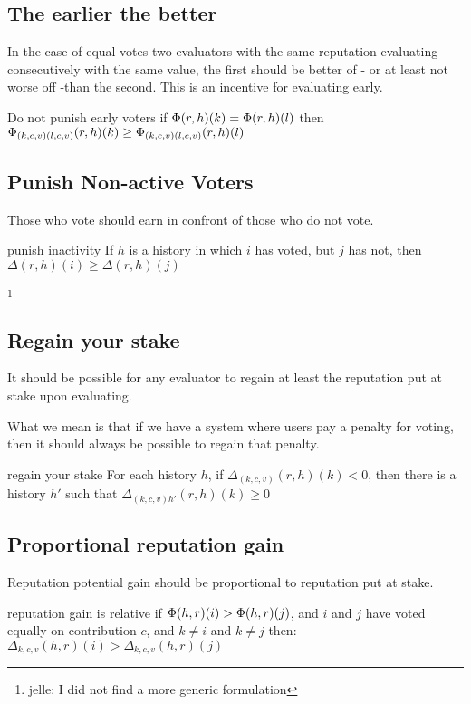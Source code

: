 \documentclass{article}
\begin{document}
\subsection{The earlier the better}


In the case of equal votes two evaluators with the same reputation evaluating consecutively with the same value, the first should be better of - or at least not worse off -than the second. This is an incentive for evaluating early.
\begin{condition}{Do not punish early voters}
if $\Phi(r, h)(k) = \Phi(r, h)(l)$ then $\Phi_{(k, c, v)(l,c,v)}(r, h)(k) \geq  \Phi_{(k, c, v)(l, c, v)}(r, h)(l)$
\end{condition}

\subsection{Punish Non-active Voters}

Those who vote should earn in confront of those who do not vote.
\begin{condition}{punish inactivity}
If $h$ is a history in which $i$ has voted, but $j$ has not, then
$\Delta(r, h)(i) \geq \Delta(r, h)(j)$
\end{condition}
\footnote{jelle: I did not find a more generic formulation}


\subsection{Regain your stake}
It should be possible for any evaluator to regain at least the reputation put at stake upon evaluating.

What we mean is that if we have a system where users pay a penalty for voting, then it should always be possible to regain that penalty. 
\begin{condition}{regain your stake}
For each history $h$, if $\Delta_{(k, c, v)}(r, h)(k) < 0$, then there is a history $h'$ such that $\Delta_{(k,c,v)h'}(r, h)(k) \geq 0$ 
\end{condition}


\subsection{Proportional reputation gain}
Reputation potential gain should be proportional to reputation put at stake.

\begin{condition}{reputation gain is relative}
if $\Phi(h,r)(i) > \Phi(h, r)(j)$, and $i$ and $j$ have voted equally on contribution $c$, and $k \neq i$ and $k \neq j$ then:
$\Delta_{k,c,v}(h, r)(i) > \Delta_{k,c,v}(h, r)(j)$
\end{condition}
\end{document}
